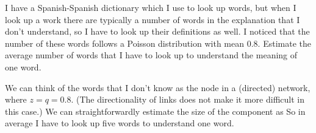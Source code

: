 I have a Spanish-Spanish dictionary which I use to look up words, but when I look up a work there are typically a number of words in the explanation that I don't understand, so I have to look up their definitions as well. I noticed that the number of these words follows a Poisson distribution with mean $0.8$. Estimate the average number of words that I have to look up to understand the meaning of one word. 

\solution
We can think of the words that I don't know as the node in a (directed) network, where $z=q=0.8$. (The directionality of links does not make it more difficult in this case.) We can straightforwardly estimate the size of the component as
So in average I have to look up five words to understand one word. 
